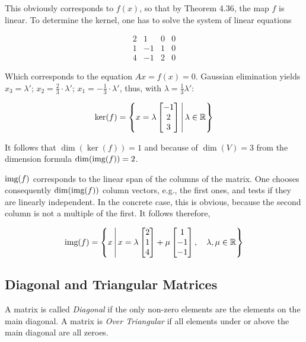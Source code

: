 This obviously corresponds to \(f(x)\), so that by Theorem 4.36, the map \(f\) is linear. To determine the kernel, one has to solve the system of linear equations

\[
    \begin{array}{cccc}
    2 & 1 & 0 & 0 \\
    1 & -1 & 1 & 0 \\
    4 & -1 & 2 & 0
    \end{array}
\]

Which corresponds to the equation \(Ax = f(x) = 0\). Gaussian 
elimination yields \(x_3 = \lambda'\); 
\(x_2 = \frac{2}{3} \cdot \lambda'\); \(x_1 = -\frac{1}{3} \cdot \lambda'\), 
thus, with \(\lambda = \frac{1}{3} \lambda'\):

\[
    \ker(f) =
    \left\{
    x = \lambda
    \begin{bmatrix}
    -1 \\
    2 \\
    3
    \end{bmatrix}
    \, \middle| \, \lambda \in \mathbb{R}
    \right\}
\]

It follows that \(\dim(\ker(f)) = 1\) and because of \(\dim(V) = 3\) from the dimension 
formula \(\dim(\text{img}(f)) = 2\). 

\(\text{img}(f)\) corresponds to the linear span of the columns of the matrix. One chooses consequently 
\(\dim(\text{img}(f))\) column vectors, e.g., the first ones, and tests if they are linearly independent. 
In the concrete case, this is obvious, because the second column is 
not a multiple of the first. It follows therefore,

\[
    \text{img}(f) =
    \left\{
    x \, \middle| \, x = \lambda
    \begin{bmatrix}
    2 \\
    1 \\
    4
    \end{bmatrix} + \mu
    \begin{bmatrix}
    1 \\
    -1 \\
    -1
    \end{bmatrix}
    , \quad \lambda, \mu \in \mathbb{R}
    \right\}
\]

\subsection{Diagonal and Triangular Matrices}

A matrix is called \emph{Diagonal} if the only non-zero elements are the elements on the main diagonal. 
A matrix is \emph{Over Triangular} if all elements under or above the main diagonal are all zeroes.


